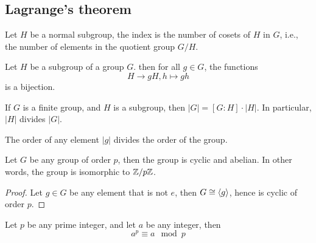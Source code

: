 \subsection{Lagrange's theorem}
\begin{defn}[index]
    Let $H$ be a normal subgroup, the index is the number of cosets of $H$ in $G$, i.e., the number of elements in the quotient group $G/H$.
\end{defn}
\begin{prop}
    Let $H$ be a subgroup of a group $G$. then for all $g\in G$, the functions
    \begin{equation*}
        H\to gH, h\mapsto gh
    \end{equation*}
    is a bijection.
\end{prop}
\begin{thm}
    If $G$ is a finite group, and $H$ is a subgroup, then $|G|=[G:H]\cdot|H|$. In particular, $|H|$ divides $|G|$.
\end{thm}
\begin{cor}
    The order of any element $|g|$ divides the order of the group.
\end{cor}
\begin{example}
    Let $G$ be any group of order $p$, then the group is cyclic and abelian. In other words, the group is isomorphic to $\mathbb{Z}/p\mathbb{Z}$.
\end{example}
\begin{proof}
    Let $g\in G$ be any element that is not $e$, then $G\cong\langle g\rangle$, hence is cyclic of order $p$.
\end{proof}
\begin{thm}
    Let $p$ be any prime integer, and let $a$ be any integer, then 
    \begin{equation*}
        a^p\equiv a\mod p
    \end{equation*}
\end{thm}


